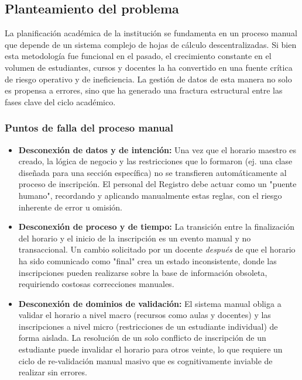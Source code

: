 \subsection{Planteamiento del problema}
\label{sec:problemDefinition}
La planificación académica de la institución se fundamenta en un proceso manual que depende de un sistema complejo de hojas de cálculo descentralizadas.
Si bien esta metodología fue funcional en el pasado, el crecimiento constante en el volumen de estudiantes, cursos y docentes la ha convertido en una fuente crítica de riesgo operativo y de ineficiencia.
La gestión de datos de esta manera no solo es propensa a errores, sino que ha generado una fractura estructural entre las fases clave del ciclo académico.

\subsubsection{Puntos de falla del proceso manual}

\begin{itemize}
    \item \textbf{Desconexión de datos y de intención:} Una vez que el horario maestro es creado, la lógica de negocio y las restricciones que lo formaron (ej. una clase diseñada para una sección específica) no se transfieren automáticamente al proceso de inscripción.
    El personal del Registro debe actuar como un "puente humano", recordando y aplicando manualmente estas reglas, con el riesgo inherente de error u omisión.

    \item \textbf{Desconexión de proceso y de tiempo:} La transición entre la finalización del horario y el inicio de la inscripción es un evento manual y no transaccional.
    Un cambio solicitado por un docente \textit{después} de que el horario ha sido comunicado como "final" crea un estado inconsistente, donde las inscripciones pueden realizarse sobre la base de información obsoleta, requiriendo costosas correcciones manuales.

    \item \textbf{Desconexión de dominios de validación:} El sistema manual obliga a validar el horario a nivel macro (recursos como aulas y docentes) y las inscripciones a nivel micro (restricciones de un estudiante individual) de forma aislada.
    La resolución de un solo conflicto de inscripción de un estudiante puede invalidar el horario para otros veinte, lo que requiere un ciclo de re-validación manual masivo que es cognitivamente inviable de realizar sin errores.
\end{itemize}

